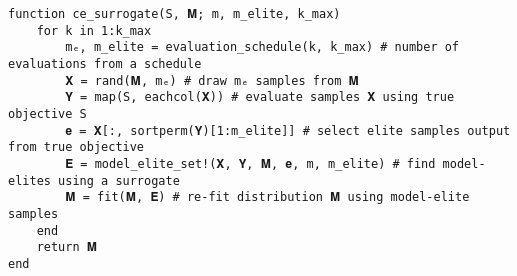 \begin{lstlisting}[language=JuliaLocal]
function ce_surrogate(S, 𝐌; m, m_elite, k_max)
    for k in 1:k_max
        mₑ, m_elite = evaluation_schedule(k, k_max) # number of evaluations from a schedule
        𝐗 = rand(𝐌, mₑ) # draw mₑ samples from 𝐌
        𝐘 = map(S, eachcol(𝐗)) # evaluate samples 𝐗 using true objective S
        𝐞 = 𝐗[:, sortperm(𝐘)[1:m_elite]] # select elite samples output from true objective
        𝐄 = model_elite_set!(𝐗, 𝐘, 𝐌, 𝐞, m, m_elite) # find model-elites using a surrogate
        𝐌 = fit(𝐌, 𝐄) # re-fit distribution 𝐌 using model-elite samples
    end
    return 𝐌
end
\end{lstlisting}
